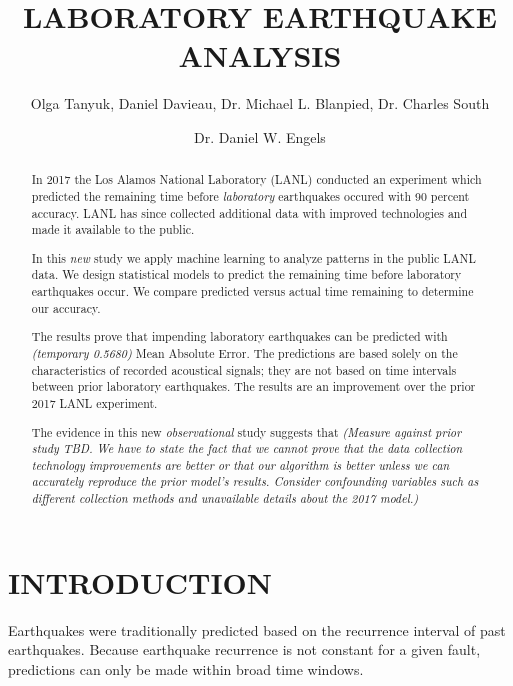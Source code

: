 \documentclass[]{llncs}
\begin{document}

\title{LABORATORY EARTHQUAKE ANALYSIS}

\author{Olga Tanyuk, Daniel Davieau, Dr. Michael L. Blanpied, Dr. Charles South \and Dr. Daniel W. Engels}


\maketitle

\begin{abstract}
In 2017 the Los Alamos National Laboratory (LANL) conducted an experiment which predicted the remaining time before {\em laboratory} earthquakes occured with 90 percent accuracy\cite{Bertrand}.
LANL has since collected additional data with improved technologies and made it available to the public.\par 

In this {\em new} study we apply machine learning to analyze patterns in the public LANL data. We design statistical models to predict the remaining time before laboratory earthquakes occur.  We compare predicted versus actual time remaining to determine our accuracy.\par

The results prove that impending laboratory earthquakes can be predicted with {\em(temporary 0.5680)} Mean Absolute Error. The predictions are based solely on the characteristics of recorded acoustical signals; they are not based on time intervals between prior laboratory earthquakes. The results are an improvement over the prior 2017 LANL experiment.\par

The evidence in this new {\em observational} study suggests that {\em (Measure against prior study TBD. We have to state the fact that we cannot prove that the data collection technology improvements are better or that our algorithm is better unless we can accurately reproduce the prior model's results. Consider confounding variables such as different collection methods and unavailable details about the 2017 model.)}\par

\end{abstract}
\section{INTRODUCTION}
Earthquakes were traditionally predicted based on the recurrence interval of past earthquakes. Because earthquake recurrence is not constant for a given fault, predictions can only be made within broad time windows.\par 
\end{document}

